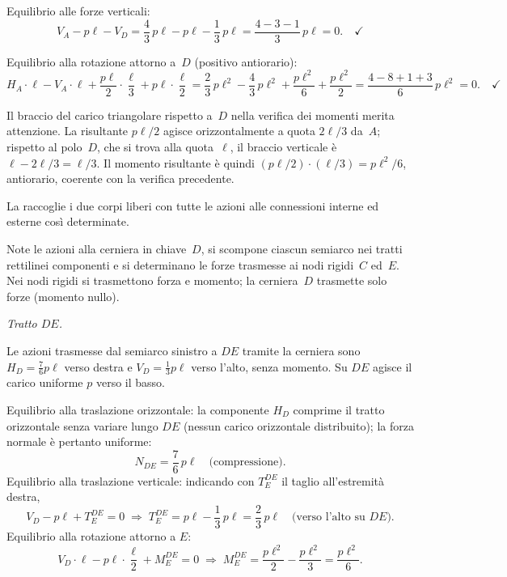 \noindent Equilibrio alle forze verticali:
\[
V_A - p\ell - V_D
= \frac{4}{3}\,p\ell - p\ell - \frac{1}{3}\,p\ell
= \frac{4 - 3 - 1}{3}\,p\ell = 0.
\quad\checkmark
\]

\noindent Equilibrio alla rotazione attorno a~$D$
(positivo antiorario):
\[
H_A\cdot\ell - V_A\cdot\ell
+ \frac{p\ell}{2}\cdot\frac{\ell}{3}
+ p\ell\cdot\frac{\ell}{2}
= \frac{2}{3}\,p\ell^2 - \frac{4}{3}\,p\ell^2
+ \frac{p\ell^2}{6} + \frac{p\ell^2}{2}
= \frac{4-8+1+3}{6}\,p\ell^2 = 0.
\quad\checkmark
\]

\begin{oss}
	Il braccio del carico triangolare rispetto a~$D$
	nella verifica dei momenti merita attenzione.
	La risultante $p\ell/2$ agisce orizzontalmente
	a quota $2\ell/3$ da~$A$; rispetto al polo~$D$,
	che si trova alla quota~$\ell$, il braccio
	verticale è $\ell - 2\ell/3 = \ell/3$.
	Il momento risultante è quindi
	$(p\ell/2)\cdot(\ell/3) = p\ell^2/6$, antiorario,
	coerente con la verifica precedente.
\end{oss}

La  raccoglie i due
corpi liberi con tutte le azioni alle connessioni
interne ed esterne così determinate.







Note le azioni alla cerniera in chiave~$D$, si scompone ciascun
semiarco nei tratti rettilinei componenti e si determinano le
forze trasmesse ai nodi rigidi~$C$ ed~$E$.
Nei nodi rigidi si trasmettono forza e momento; la cerniera~$D$
trasmette solo forze (momento nullo).

\medskip
\noindent\textit{Tratto $DE$.}

Le azioni trasmesse dal semiarco sinistro a $DE$ tramite la
cerniera sono $H_D = \tfrac{7}{6}p\ell$ verso destra
e $V_D = \tfrac{1}{3}p\ell$ verso l'alto, senza momento.
Su $DE$ agisce il carico uniforme $p$ verso il basso.

Equilibrio alla traslazione orizzontale:
la componente $H_D$ comprime il tratto orizzontale senza
variare lungo $DE$ (nessun carico orizzontale distribuito);
la forza normale è pertanto uniforme:
\[
N_{DE} = \frac{7}{6}\,p\ell \quad\text{(compressione).}
\]
Equilibrio alla traslazione verticale: indicando con
$T_E^{DE}$ il taglio all'estremità destra,
\[
V_D - p\ell + T_E^{DE} = 0
\;\Rightarrow\;
T_E^{DE} = p\ell - \frac{1}{3}\,p\ell = \frac{2}{3}\,p\ell
\quad\text{(verso l'alto su }DE\text{).}
\]
Equilibrio alla rotazione attorno a $E$:
\[
V_D\cdot\ell - p\ell\cdot\frac{\ell}{2} + M_E^{DE} = 0
\;\Rightarrow\;
M_E^{DE} = \frac{p\ell^2}{2} - \frac{p\ell^2}{3}
= \frac{p\ell^2}{6}.
\]

